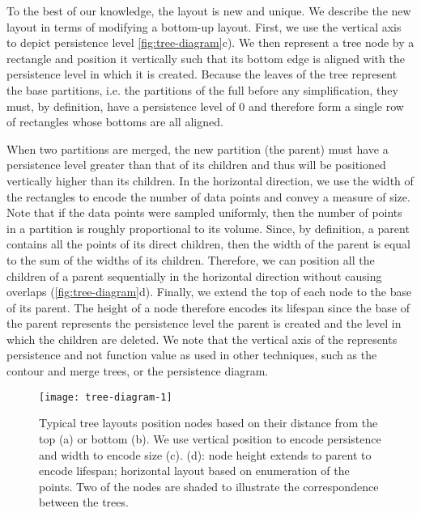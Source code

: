 To the best of our knowledge, the \RT layout is new and unique. We describe the new layout in terms of modifying a bottom-up layout. First, we use the vertical axis to depict persistence level \autoref{fig:tree-diagram}c). We then represent a tree node by a rectangle and position it vertically such that its bottom edge is aligned with the persistence level in which it is created. Because the leaves of the tree represent the base partitions, i.e. the partitions of the full \MSC before any simplification, they must, by definition, have a persistence level of 0 and therefore form a single row of rectangles whose bottoms are all aligned. 

When two partitions are merged, the new partition (the parent) must have a persistence level greater than that of its children and thus will be positioned vertically higher than its children. In the horizontal direction, we use the width of the rectangles to encode the number of data points and convey a measure of size. Note that if the data points were sampled uniformly, then the number of points in a partition is roughly proportional to its volume. Since, by definition, a parent contains all the points of its direct children, then the width of the parent is equal to the sum of the widths of its children. Therefore, we can position all the children of a parent sequentially in the horizontal direction without causing overlaps (\autoref{fig:tree-diagram}d). Finally, we extend the top of each node to the base of its parent. The height of a node therefore encodes its lifespan since the base of the parent represents the persistence level the parent is created and the level in which the children are deleted. We note that the vertical axis of the \RT represents persistence and not function value as used in other techniques, such as the contour and merge trees, or the persistence diagram.

\begin{figure}[tb]
    \begin{center}
     \texttt{[image: tree-diagram-1]}
    \caption{Typical tree layouts position nodes based on their distance from the top (a) or bottom (b). We use vertical position to encode persistence and width to encode size (c). \RT (d): node height extends to parent to encode lifespan; horizontal layout based on enumeration of the points. Two of the nodes are shaded to illustrate the correspondence between the trees.}
    \label{fig:tree-diagram}
    \end{center}
\end{figure}

